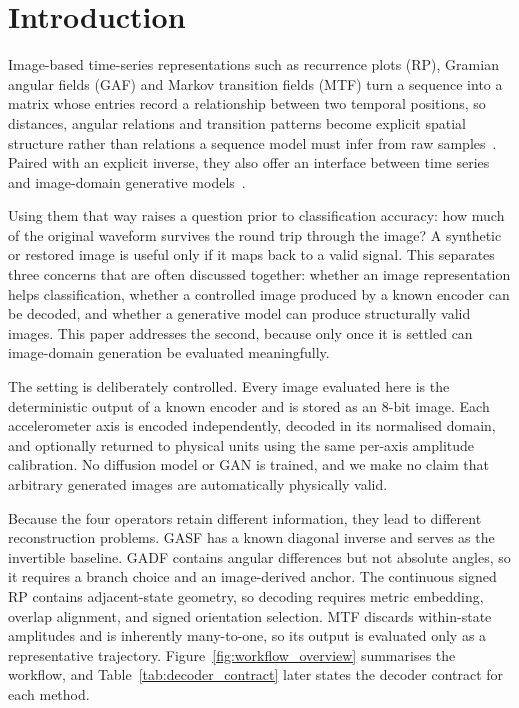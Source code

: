 \documentclass[preprint,12pt]{elsarticle}
\begin{document}
\section{Introduction}\label{sec:introduction}
Image-based time-series representations such as recurrence plots (RP), Gramian angular fields (GAF) and Markov transition fields (MTF) turn a sequence into a matrix whose entries record a relationship between two temporal positions, so distances, angular relations and transition patterns become explicit spatial structure rather than relations a sequence model must infer from raw samples~\cite{wang2015encoding,wang2015encoding2}. Paired with an explicit inverse, they also offer an interface between time series and image-domain generative models~\cite{huang2023tsdigan,hellermann2026imagegan}.

Using them that way raises a question prior to classification accuracy: how much of the original waveform survives the round trip through the image? A synthetic or restored image is useful only if it maps back to a valid signal. This separates three concerns that are often discussed together: whether an image representation helps classification, whether a controlled image produced by a known encoder can be decoded, and whether a generative model can produce structurally valid images. This paper addresses the second, because only once it is settled can image-domain generation be evaluated meaningfully.

The setting is deliberately controlled. Every image evaluated here is the deterministic output of a known encoder and is stored as an 8-bit image. Each accelerometer axis is encoded independently, decoded in its normalised domain, and optionally returned to physical units using the same per-axis amplitude calibration. No diffusion model or GAN is trained, and we make no claim that arbitrary generated images are automatically physically valid.

Because the four operators retain different information, they lead to different reconstruction problems. GASF has a known diagonal inverse and serves as the invertible baseline. GADF contains angular differences but not absolute angles, so it requires a branch choice and an image-derived anchor. The continuous signed RP contains adjacent-state geometry, so decoding requires metric embedding, overlap alignment, and signed orientation selection. MTF discards within-state amplitudes and is inherently many-to-one, so its output is evaluated only as a representative trajectory. Figure~\ref{fig:workflow_overview} summarises the workflow, and Table~\ref{tab:decoder_contract} later states the decoder contract for each method.
\end{document}
